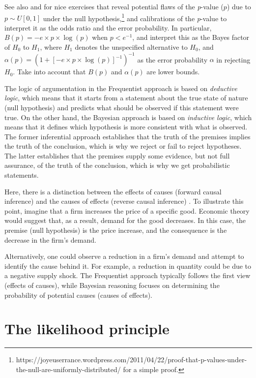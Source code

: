 See also \cite{sellke2001calibration} and \cite{benjamin2018redefine} for nice exercises that reveal potential flaws of the \textit{p}-value ($p$) due to $p \sim U[0,1]$ under the null hypothesis,\footnote{https://joyeuserrance.wordpress.com/2011/04/22/proof-that-p-values-under-the-null-are-uniformly-distributed/ for a simple proof.} and calibrations of the \textit{p}-value to interpret it as the odds ratio and the error probability. In particular, $B(p)=-e \times p \times \log(p)$ when $p < e^{-1}$, and interpret this as the Bayes factor of $H_0$ to $H_1$, where $H_1$ denotes the unspecified alternative to $H_0$, and $\alpha(p) = \left(1 + \left[-e \times p \times \log(p)\right]^{-1}\right)^{-1}$ as the error probability $\alpha$ in rejecting $H_0$. Take into account that $B(p)$ and $\alpha(p)$ are lower bounds.

The logic of argumentation in the Frequentist approach is based on \textit{deductive logic}, which means that it starts from a statement about the true state of nature (null hypothesis) and predicts what should be observed if this statement were true. On the other hand, the Bayesian approach is based on \textit{inductive logic}, which means that it defines which hypothesis is more consistent with what is observed. The former inferential approach establishes that the truth of the premises implies the truth of the conclusion, which is why we reject or fail to reject hypotheses. The latter establishes that the premises supply some evidence, but not full assurance, of the truth of the conclusion, which is why we get probabilistic statements.

Here, there is a distinction between the effects of causes (forward causal inference) and the causes of effects (reverse causal inference) \cite{Gelman2013, Dawid2016}. To illustrate this point, imagine that a firm increases the price of a specific good. Economic theory would suggest that, as a result, demand for the good decreases. In this case, the premise (null hypothesis) is the price increase, and the consequence is the decrease in the firm's demand.

Alternatively, one could observe a reduction in a firm's demand and attempt to identify the cause behind it. For example, a reduction in quantity could be due to a negative supply shock. The Frequentist approach typically follows the first view (effects of causes), while Bayesian reasoning focuses on determining the probability of potential causes (causes of effects).

\section{The likelihood principle}\label{sec24} 

